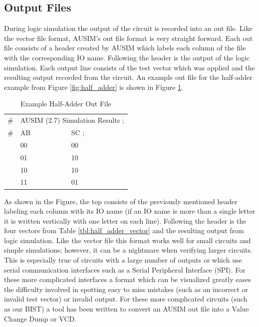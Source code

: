 \documentclass[12pt]{report}
\begin{document}
\subsection{Output Files}
During logic simulation the output of the circuit is recorded into an out file.  Like the vector file format, AUSIM's out file format is very straight forward.  Each out file consists of a header created by AUSIM which labels each column of the file with the corresponding IO name.  Following the header is the output of the logic simulation.  Each output line consists of the test vector which was applied and the resulting output recorded from the circuit.  An example out file for the half-adder example from Figure \ref{fig:half_adder} is shown in Figure \ref{tbl:half_adder_out}.
\begin{table}
	\caption{Example Half-Adder Out File}
	\begin{center}
		\begin{tabular}{lll}
			\# & \multicolumn{2}{l}{AUSIM (2.7) Simulation Results ;} \\
			\# & AB & SC ; \\
			   & 00 & 00 \\
			   & 01 & 10 \\
			   & 10 & 10 \\
			   & 11 & 01 \\
		\end{tabular}
	\end{center}
	\label{tbl:half_adder_out}
\end{table}
As shown in the Figure, the top consists of the previously mentioned header labeling each column with its IO name (if an IO name is more than a single letter it is written vertically with one letter on each line).  Following the header is the four vectors from Table \ref{tbl:half_adder_vector} and the resulting output from logic simulation.  Like the vector file this format works well for small circuits and simple simulations; however, it can be a nightmare when verifying larger circuits.  This is especially true of circuits with a large number of outputs or which use serial communication interfaces such as a Serial Peripheral Interface (SPI).  For these more complicated interfaces a format which can be visualized greatly eases the difficulty involved in spotting easy to miss mistakes (such as an incorrect or invalid test vector) or invalid output.  For these more complicated circuits (such as our BIST) a tool has been written to convert an AUSIM out file into a Value Change Dump or VCD.
\end{document}
